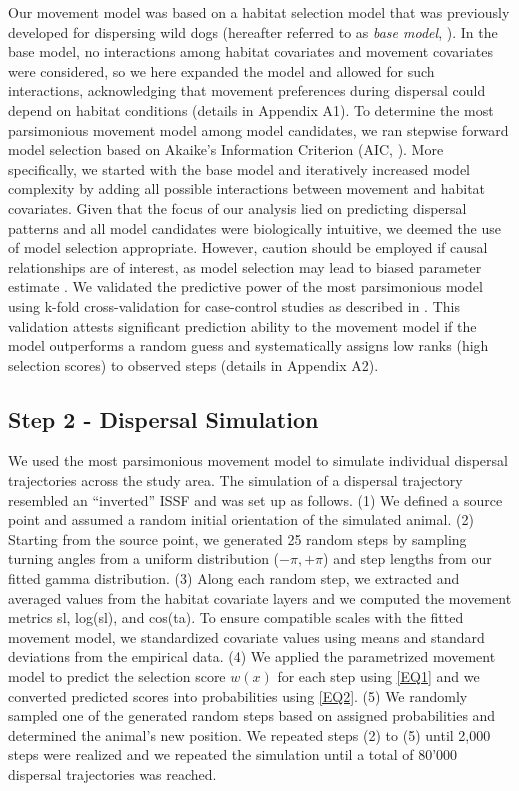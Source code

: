 \documentclass[abstract=on,10pt,a4paper,bibliography=totocnumbered]{article}
\begin{document}
Our movement model was based on a habitat selection model that was previously
developed for dispersing wild dogs (hereafter referred to as \textit{base
model}, \citealp{Hofmann.2021}). In the base model, no interactions among
habitat covariates and movement covariates were considered, so we here expanded
the model and allowed for such interactions, acknowledging that movement
preferences during dispersal could depend on habitat conditions (details in
Appendix A1). To determine the most parsimonious movement model among model
candidates, we ran stepwise forward model selection based on Akaike's
Information Criterion (AIC, \citealp{Burnham.2002}). More specifically, we
started with the base model and iteratively increased model complexity by adding
all possible interactions between movement and habitat covariates. Given that
the focus of our analysis lied on predicting dispersal patterns and all model
candidates were biologically intuitive, we deemed the use of model selection
appropriate. However, caution should be employed if causal relationships are of
interest, as model selection may lead to biased parameter estimate
\citep{Whittingham.2006}. We validated the predictive power of the most
parsimonious model using k-fold cross-validation for case-control studies as
described in \cite{Fortin.2009}. This validation attests significant prediction
ability to the movement model if the model outperforms a random guess and
systematically assigns low ranks (high selection scores) to observed steps
(details in Appendix A2).

\subsection{Step 2 - Dispersal Simulation}
We used the most parsimonious movement model to simulate individual dispersal
trajectories across the study area. The simulation of a dispersal trajectory
resembled an ``inverted'' ISSF and was set up as follows. (1) We defined a
source point and assumed a random initial orientation of the simulated animal.
(2) Starting from the source point, we generated 25 random steps by sampling
turning angles from a uniform distribution (\(-\pi, +\pi\)) and step lengths
from our fitted gamma distribution. (3) Along each random step, we extracted and
averaged values from the habitat covariate layers and we computed the movement
metrics \textsf{sl}, \textsf{log(sl)}, and \textsf{cos(ta)}. To ensure
compatible scales with the fitted movement model, we standardized covariate
values using means and standard deviations from the empirical data. (4) We
applied the parametrized movement model to predict the selection score \(w(x)\)
for each step using \ref{EQ1} and we converted predicted scores into
probabilities using \ref{EQ2}. (5) We randomly sampled one of the generated
random steps based on assigned probabilities and determined the animal's new
position. We repeated steps (2) to (5) until 2,000 steps were realized and we
repeated the simulation until a total of 80'000 dispersal trajectories was
reached.
\end{document}
